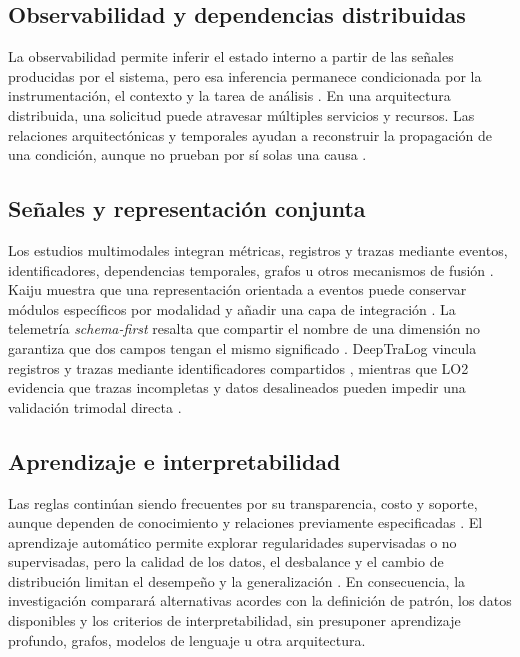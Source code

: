 \documentclass[conference]{IEEEtran}
\begin{document}
\subsection{Observabilidad y dependencias distribuidas}

La observabilidad permite inferir el estado interno a partir de las señales producidas por el sistema, pero esa inferencia permanece condicionada por la instrumentación, el contexto y la tarea de análisis \cite{ref1,ref15}. En una arquitectura distribuida, una solicitud puede atravesar múltiples servicios y recursos. Las relaciones arquitectónicas y temporales ayudan a reconstruir la propagación de una condición, aunque no prueban por sí solas una causa \cite{ref4,ref10}.

\subsection{Señales y representación conjunta}

Los estudios multimodales integran métricas, registros y trazas mediante eventos, identificadores, dependencias temporales, grafos u otros mecanismos de fusión \cite{ref5,ref6,ref7,ref8,ref18,ref19}. Kaiju muestra que una representación orientada a eventos puede conservar módulos específicos por modalidad y añadir una capa de integración \cite{ref11}. La telemetría \textit{schema-first} resalta que compartir el nombre de una dimensión no garantiza que dos campos tengan el mismo significado \cite{ref16}. DeepTraLog vincula registros y trazas mediante identificadores compartidos \cite{ref17}, mientras que LO2 evidencia que trazas incompletas y datos desalineados pueden impedir una validación trimodal directa \cite{ref22}.

\subsection{Aprendizaje e interpretabilidad}

Las reglas continúan siendo frecuentes por su transparencia, costo y soporte, aunque dependen de conocimiento y relaciones previamente especificadas \cite{ref20}. El aprendizaje automático permite explorar regularidades supervisadas o no supervisadas, pero la calidad de los datos, el desbalance y el cambio de distribución limitan el desempeño y la generalización \cite{ref2,ref3}. En consecuencia, la investigación comparará alternativas acordes con la definición de patrón, los datos disponibles y los criterios de interpretabilidad, sin presuponer aprendizaje profundo, grafos, modelos de lenguaje u otra arquitectura.
\end{document}

